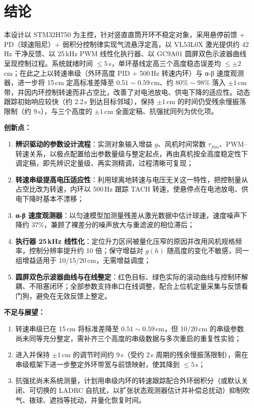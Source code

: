 \documentclass[12pt,a4paper]{ctexart}
\begin{document}
\section{结论}

本设计以 STM32H750 为主控，针对竖直直筒开环不稳定对象，采用悬停前馈 + PD（球速阻尼）+ 弱积分控制律实现气流悬浮定高，以 VL53L0X 激光提供约 42\,Hz 干净反馈、以 25\,kHz PWM 线性化执行器、以 GC9A01 圆屏双色示波器曲线呈现控制过程。系统就绪时间 $\le5$\,s，单环基线定高三个高度稳态误差均 $\le\pm2$\,cm；在此之上以转速串级（外环高度 PID + 500\,Hz 转速内环）与 α-β 速度观测器，进一步将 15\,cm 定高标准差降至 $0.51\sim0.59$\,cm、约 $80\%\sim98\%$ 落入 $\pm1$\,cm 带，并因内环控制转速而非占空比，改善了对电池放电、供电下降的适应性。动态跟踪初始响应较快（约 2.2\,s 到达目标邻域），保持 $\pm1$\,cm 的时间仍受残余慢振荡限制（约 9\,s），与三个高度的 $\pm1$\,cm 全面定稿、抗强扰同列为优化项。

\noindent\textbf{创新点：}
\begin{enumerate}[leftmargin=2em,itemsep=2pt]
  \item \textbf{辨识驱动的参数设计流程}：实测对象输入增益 $g$、风机时间常数 $\tau_{fan}$、PWM--转速关系，以极点配置给出参数量级与整定起点，再由真机按全高度稳定性下调定稿，即先辨识定量级、再实测精调，过程清晰可复现；
  \item \textbf{转速串级提高电压适应性}：利用球离地转速与电压无关这一特性，把控制量从占空比改为转速，内环以 500\,Hz 跟踪 TACH 转速，使悬停点在电池放电、供电下降时基本不漂移；
  \item \textbf{α-β 速度观测器}：以匀速模型加测量残差从激光数据中估计球速，速度噪声下降约 37\%，兼顾了裸差分的噪声放大与重滤波的相位滞后；
  \item \textbf{执行器 25\,kHz 线性化}：定位升力区间被量化压窄的原因并改用风机规格频率，控制分辨率提升约 10 倍；保守增益对 $g(h)$ 随高度的变化不敏感，同一组增益适用于 10/15/20\,cm，无需增益调度；
  \item \textbf{圆屏双色示波器曲线与在线整定}：红色目标、绿色实际的滚动曲线与控制环解耦、不阻塞闭环；全部参数支持串口在线调整，配合上位机定量采集与反馈看门狗，避免在无效反馈上整定。
\end{enumerate}

\noindent\textbf{不足与展望：}
\begin{enumerate}[leftmargin=2em,itemsep=2pt]
  \item 转速串级已在 15\,cm 将标准差降至 $0.51\sim0.59$\,cm，但 10/20\,cm 的串级参数尚未同等充分整定，需补齐三个高度的串级数据与多次重启的重复性实验；
  \item 进入并保持 $\pm1$\,cm 的调节时间约 9\,s（受约 2\,s 周期的残余慢振荡限制），需在串级框架下进一步整定外环带宽与前馈映射，使其降到 $\le5$\,s；
  \item 抗强扰尚未系统测量，计划用串级内环的转速跟踪配合外环弱积分（或默认关闭、可切换的 LADRC 自抗扰，以扩张状态观测器估计并补偿总扰动）抑制吹气、拨球、遮挡等扰动，并量化恢复时间。
\end{enumerate}
\end{document}
